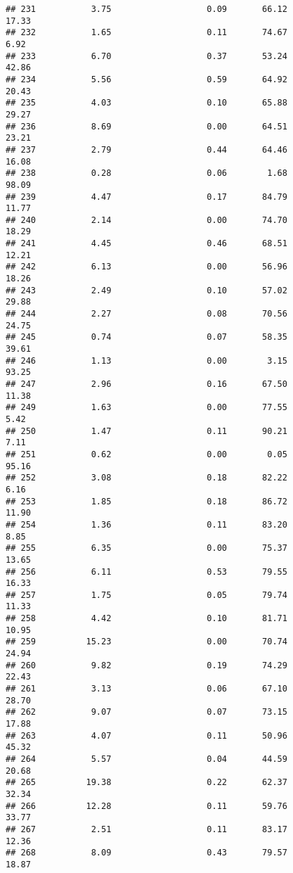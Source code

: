 \documentclass[
]{article}
\begin{document}
\begin{verbatim}
## 231           3.75                   0.09       66.12          17.33
## 232           1.65                   0.11       74.67           6.92
## 233           6.70                   0.37       53.24          42.86
## 234           5.56                   0.59       64.92          20.43
## 235           4.03                   0.10       65.88          29.27
## 236           8.69                   0.00       64.51          23.21
## 237           2.79                   0.44       64.46          16.08
## 238           0.28                   0.06        1.68          98.09
## 239           4.47                   0.17       84.79          11.77
## 240           2.14                   0.00       74.70          18.29
## 241           4.45                   0.46       68.51          12.21
## 242           6.13                   0.00       56.96          18.26
## 243           2.49                   0.10       57.02          29.88
## 244           2.27                   0.08       70.56          24.75
## 245           0.74                   0.07       58.35          39.61
## 246           1.13                   0.00        3.15          93.25
## 247           2.96                   0.16       67.50          11.38
## 249           1.63                   0.00       77.55           5.42
## 250           1.47                   0.11       90.21           7.11
## 251           0.62                   0.00        0.05          95.16
## 252           3.08                   0.18       82.22           6.16
## 253           1.85                   0.18       86.72          11.90
## 254           1.36                   0.11       83.20           8.85
## 255           6.35                   0.00       75.37          13.65
## 256           6.11                   0.53       79.55          16.33
## 257           1.75                   0.05       79.74          11.33
## 258           4.42                   0.10       81.71          10.95
## 259          15.23                   0.00       70.74          24.94
## 260           9.82                   0.19       74.29          22.43
## 261           3.13                   0.06       67.10          28.70
## 262           9.07                   0.07       73.15          17.88
## 263           4.07                   0.11       50.96          45.32
## 264           5.57                   0.04       44.59          20.68
## 265          19.38                   0.22       62.37          32.34
## 266          12.28                   0.11       59.76          33.77
## 267           2.51                   0.11       83.17          12.36
## 268           8.09                   0.43       79.57          18.87

\end{verbatim}
\end{document}
